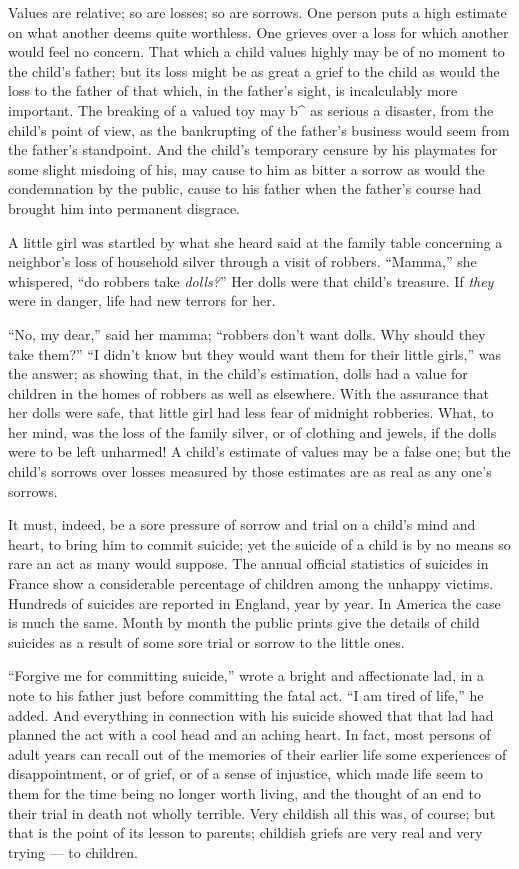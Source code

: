 \documentclass[
]{book}
\begin{document}
Values are relative; so are losses; so are sorrows. One person puts a high estimate on what another deems quite worthless. One grieves over a loss for which another would feel no concern. That which a child values highly may be of no moment to the child's father; but its loss might be as great a grief to the child as would the loss to the father of that which, in the father's sight, is incalculably more important. The breaking of a valued toy may b\^{} as serious a disaster, from the child's point of view, as the bankrupting of the father's business would seem from the father's standpoint. And the child's temporary censure by his playmates for some slight misdoing of his, may cause to him as bitter a sorrow as would the condemnation by the public, cause to his father when the father's course had brought him into permanent disgrace.

A little girl was startled by what she heard said at the family table concerning a neighbor's loss of household silver through a visit of robbers. ``Mamma,'' she whispered, ``do robbers take \emph{dolls?}'' Her dolls were that child's treasure. If \emph{they} were in danger, life had new terrors for her.

``No, my dear,'' said her mamma; ``robbers don't want dolls. Why should they take them?'' ``I didn't know but they would want them for their little girls,'' was the answer; as showing that, in the child's estimation, dolls had a value for children in the homes of robbers as well as elsewhere. With the assurance that her dolls were safe, that little girl had less fear of midnight robberies. What, to her mind, was the loss of the family silver, or of clothing and jewels, if the dolls were to be left unharmed! A child's estimate of values may be a false one; but the child's sorrows over losses measured by those estimates are as real as any one's sorrows.

It must, indeed, be a sore pressure of sorrow and trial on a child's mind and heart, to bring him to commit suicide; yet the suicide of a child is by no means so rare an act as many would suppose. The annual official statistics of suicides in France show a considerable percentage of children among the unhappy victims. Hundreds of suicides are reported in England, year by year. In America the case is much the same. Month by month the public prints give the details of child suicides as a result of some sore trial or sorrow to the little ones.

``Forgive me for committing suicide,'' wrote a bright and affectionate lad, in a note to his father just before committing the fatal act. ``I am tired of life,'' he added. And everything in connection with his suicide showed that that lad had planned the act with a cool head and an aching heart. In fact, most persons of adult years can recall out of the memories of their earlier life some experiences of disappointment, or of grief, or of a sense of injustice, which made life seem to them for the time being no longer worth living, and the thought of an end to their trial in death not wholly terrible. Very childish all this was, of course; but that is the point of its lesson to parents; childish griefs are very real and very trying --- to children.
\end{document}
